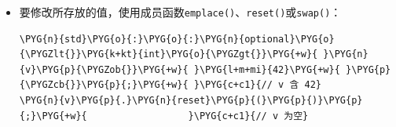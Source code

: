 \begin{itemize}
\begin{codeblockbg}
\begin{Verbatim}[commandchars=\\\{\},breaklines=true,breakanywhere=true,fontsize=\codefont,xleftmargin=17bp]
\PYG{k}{struct}\PYG{+w}{ }\PYG{n+nc}{foo}
\PYG{p}{\PYGZob{}}
\PYG{+w}{  }\PYG{k+kt}{int}\PYG{+w}{ }\PYG{n}{a}\PYG{p}{;}
\PYG{+w}{  }\PYG{k+kt}{double}\PYG{+w}{ }\PYG{n}{b}\PYG{p}{;}
\PYG{p}{\PYGZcb{}}\PYG{p}{;}
\PYG{n}{std}\PYG{o}{:}\PYG{o}{:}\PYG{n}{optional}\PYG{o}{\PYGZlt{}}\PYG{k+kt}{int}\PYG{o}{\PYGZgt{}}\PYG{+w}{ }\PYG{n}{v1}\PYG{p}{\PYGZob{}}\PYG{+w}{ }\PYG{l+m+mi}{42}\PYG{+w}{ }\PYG{p}{\PYGZcb{}}\PYG{p}{;}
\PYG{k}{if}\PYG{+w}{ }\PYG{p}{(}\PYG{n}{v1}\PYG{p}{)}\PYG{+w}{ }\PYG{n}{std}\PYG{o}{:}\PYG{o}{:}\PYG{n}{cout}\PYG{+w}{ }\PYG{o}{\PYGZlt{}}\PYG{o}{\PYGZlt{}}\PYG{+w}{ }\PYG{o}{*}\PYG{n}{v1}\PYG{+w}{ }\PYG{o}{\PYGZlt{}}\PYG{o}{\PYGZlt{}}\PYG{+w}{ }\PYG{n}{std}\PYG{o}{:}\PYG{o}{:}\PYG{n}{endl}\PYG{p}{;}
\PYG{n}{std}\PYG{o}{:}\PYG{o}{:}\PYG{n}{optional}\PYG{o}{\PYGZlt{}}\PYG{n}{foo}\PYG{o}{\PYGZgt{}}\PYG{+w}{ }\PYG{n}{v2}\PYG{p}{\PYGZob{}}\PYG{+w}{ }\PYG{n}{foo}\PYG{p}{\PYGZob{}}\PYG{+w}{ }\PYG{l+m+mi}{42}\PYG{p}{,}\PYG{+w}{ }\PYG{l+m+mf}{10.5}\PYG{+w}{ }\PYG{p}{\PYGZcb{}}\PYG{+w}{ }\PYG{p}{\PYGZcb{}}\PYG{p}{;}
\PYG{k}{if}\PYG{+w}{ }\PYG{p}{(}\PYG{n}{v2}\PYG{p}{.}\PYG{n}{has\PYGZus{}value}\PYG{p}{(}\PYG{p}{)}\PYG{p}{)}
\PYG{+w}{  }\PYG{n}{std}\PYG{o}{:}\PYG{o}{:}\PYG{n}{cout}\PYG{+w}{ }\PYG{o}{\PYGZlt{}}\PYG{o}{\PYGZlt{}}\PYG{+w}{ }\PYG{n}{v2}\PYG{o}{\PYGZhy{}}\PYG{o}{\PYGZgt{}}\PYG{n}{a}\PYG{+w}{ }\PYG{o}{\PYGZlt{}}\PYG{o}{\PYGZlt{}}\PYG{+w}{ }\PYG{l+s}{\PYGZdq{}}\PYG{l+s}{, }\PYG{l+s}{\PYGZdq{}}\PYG{+w}{ }\PYG{o}{\PYGZlt{}}\PYG{o}{\PYGZlt{}}\PYG{+w}{ }\PYG{n}{v2}\PYG{o}{\PYGZhy{}}\PYG{o}{\PYGZgt{}}\PYG{n}{b}\PYG{+w}{ }\PYG{o}{\PYGZlt{}}\PYG{o}{\PYGZlt{}}\PYG{+w}{ }\PYG{n}{std}\PYG{o}{:}\PYG{o}{:}\PYG{n}{endl}\PYG{p}{;}
\end{Verbatim}
\end{codeblockbg}



\item 要修改所存放的值，使用成员函数\texttt{emplace()}、\texttt{reset()}或\texttt{swap()}：



\begin{codeblockbg}
\begin{Verbatim}[commandchars=\\\{\},breaklines=true,breakanywhere=true,fontsize=\codefont,xleftmargin=17bp]
\PYG{n}{std}\PYG{o}{:}\PYG{o}{:}\PYG{n}{optional}\PYG{o}{\PYGZlt{}}\PYG{k+kt}{int}\PYG{o}{\PYGZgt{}}\PYG{+w}{ }\PYG{n}{v}\PYG{p}{\PYGZob{}}\PYG{+w}{ }\PYG{l+m+mi}{42}\PYG{+w}{ }\PYG{p}{\PYGZcb{}}\PYG{p}{;}\PYG{+w}{ }\PYG{c+c1}{// v 含 42}
\PYG{n}{v}\PYG{p}{.}\PYG{n}{reset}\PYG{p}{(}\PYG{p}{)}\PYG{p}{;}\PYG{+w}{                  }\PYG{c+c1}{// v 为空}
\end{Verbatim}
\end{codeblockbg}

\end{itemize}


